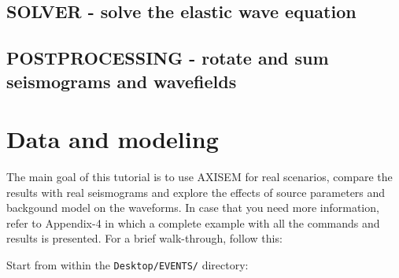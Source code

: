 \documentclass{article}
\begin{document}
\subsection{SOLVER - solve the elastic wave equation}

\subsection{POSTPROCESSING - rotate and sum seismograms and wavefields}

\newpage




\section{Data and modeling}
The main goal of this tutorial is to use AXISEM for real scenarios, 
compare the results with real seismograms and explore the effects of source parameters and backgound model on the waveforms. 
In case that you need more information, 
refer to Appendix-4 in which a complete example with all the commands and results is presented.
For a brief walk-through, follow this:

Start from within the \verb|Desktop/EVENTS/| directory:
\end{document}
